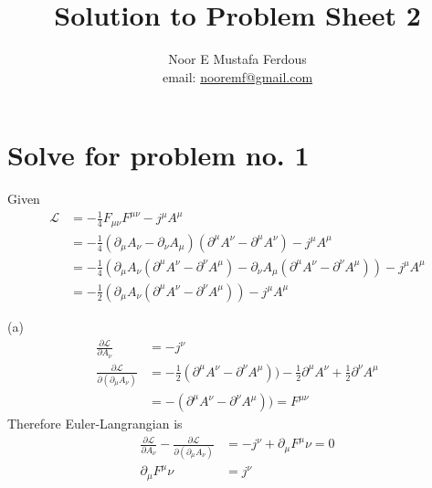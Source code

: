 \documentclass[12pt, letterpaper]{article}
\title{Solution to Problem Sheet 2}
\author{Noor E Mustafa Ferdous\\ email: \href{mailto:nooremf@gmail.com}{nooremf@gmail.com} }
\date{}
\newcommand*{\1}{\hspace{1pt}}
\begin{document}
\maketitle

\section*{Solve for problem no. 1}

Given
\begin{align*}
    \mathcal{L} &= -\frac{1}{4}F_{\mu \nu} F^{\mu \nu} - j^{\mu} A^{\mu} \\
    &= -\frac{1}{4}(\partial_{\mu}A_{\nu} - \partial_{\nu}A_{\mu})(\partial^{\mu} A^{\nu} - \partial^{\mu} A^{\nu})  - j^{\mu} A^{\mu}\\
    &= -\frac{1}{4}(\partial_{\mu} A_{\nu}(\partial^{\mu} A^{\nu} - \partial^{\nu} A^{\mu})  - \partial_{\nu} A_{\mu}(\partial^{\mu} A^{\nu} - \partial^{\nu} A^{\mu})) - j^{\mu} A^{\mu}\\
    &= -\frac{1}{2}(\partial_{\mu} A_{\nu}(\partial^{\mu} A^{\nu} - \partial^{\nu} A^{\mu})) - j^{\mu} A^{\mu}
\end{align*}

(a)
\begin{align*}
    \frac{\partial \mathcal{L}}{\partial A_{\nu}} &= - j^{\nu} \\
    \frac{\partial \mathcal{L}}{\partial (\partial _{\mu} A_{\nu})} &= -\frac{1}{2}(\partial^{\mu} A^{\nu} - \partial^{\nu} A^{\mu})) -\frac{1}{2}\partial^{\mu} A^{\nu} + \frac{1}{2}\partial^{\nu} A^{\mu} \\ 
    &= -(\partial^{\mu} A^{\nu} - \partial^{\nu} A^{\mu})) = F^{\mu \nu}
\end{align*}
Therefore Euler-Langrangian is 
\begin{align*}
    \frac{\partial \mathcal{L}}{\partial A_{\nu}} - \frac{\partial \mathcal{L}}{\partial (\partial _{\mu} A_{\nu})} &= -j^{\nu} + \partial_{\mu} F^{\mu}{\nu} = 0 \\ 
    \partial_{\mu} F^{\mu}{\nu} &= j^{\nu}  
\end{align*}
\end{document}

